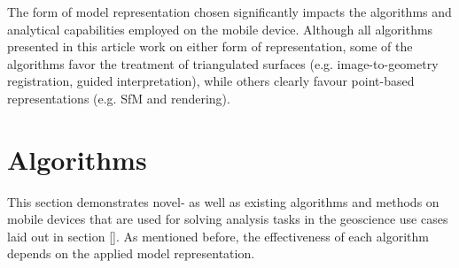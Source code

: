 \documentclass[review]{elsarticle}
\begin{document}
The form of model representation chosen significantly impacts the algorithms and analytical capabilities employed on the mobile device. Although all algorithms presented in this article work on either form of representation, some of the algorithms favor the treatment of triangulated surfaces (e.g. image-to-geometry registration, guided interpretation), while others clearly favour point-based representations (e.g. \gls{SfM} and rendering).

\section{Algorithms}
\label{sec:algorithms}

This section demonstrates novel- as well as existing algorithms and methods on mobile devices that are used for solving analysis tasks in the geoscience use cases laid out in section \ref{}. As mentioned before, the effectiveness of each algorithm depends on the applied model representation.

%

\end{document}
